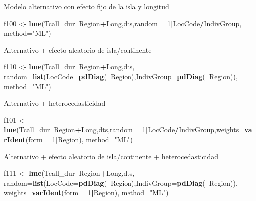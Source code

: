 \documentclass[]{article}
\newenvironment{Shaded}{\begin{snugshade}}{\end{snugshade}}
\newcommand{\DataTypeTok}[1]{\textcolor[rgb]{0.13,0.29,0.53}{#1}}
\newcommand{\DecValTok}[1]{\textcolor[rgb]{0.00,0.00,0.81}{#1}}
\newcommand{\KeywordTok}[1]{\textcolor[rgb]{0.13,0.29,0.53}{\textbf{#1}}}
\newcommand{\NormalTok}[1]{#1}
\newcommand{\OperatorTok}[1]{\textcolor[rgb]{0.81,0.36,0.00}{\textbf{#1}}}
\newcommand{\StringTok}[1]{\textcolor[rgb]{0.31,0.60,0.02}{#1}}
\begin{document}
Modelo alternativo con efecto fijo de la isla y longitud

\begin{Shaded}
\begin{Highlighting}[]
\NormalTok{f100 <-}\StringTok{ }\KeywordTok{lme}\NormalTok{(Tcall_dur}\OperatorTok{~}\NormalTok{Region}\OperatorTok{+}\NormalTok{Long,dts,}\DataTypeTok{random=}\OperatorTok{~}\DecValTok{1}\OperatorTok{|}\NormalTok{LocCode}\OperatorTok{/}\NormalTok{IndivGroup, }\DataTypeTok{method=}\StringTok{"ML"}\NormalTok{)}
\end{Highlighting}
\end{Shaded}

Alternativo + efecto aleatorio de isla/continente

\begin{Shaded}
\begin{Highlighting}[]
\NormalTok{f110 <-}\StringTok{ }\KeywordTok{lme}\NormalTok{(Tcall_dur}\OperatorTok{~}\NormalTok{Region}\OperatorTok{+}\NormalTok{Long,dts,}
     \DataTypeTok{random=}\KeywordTok{list}\NormalTok{(}\DataTypeTok{LocCode=}\KeywordTok{pdDiag}\NormalTok{(}\OperatorTok{~}\NormalTok{Region),}\DataTypeTok{IndivGroup=}\KeywordTok{pdDiag}\NormalTok{(}\OperatorTok{~}\NormalTok{Region)), }\DataTypeTok{method=}\StringTok{"ML"}\NormalTok{)}
\end{Highlighting}
\end{Shaded}

Alternativo + heterocedasticidad

\begin{Shaded}
\begin{Highlighting}[]
\NormalTok{f101 <-}\StringTok{ }\KeywordTok{lme}\NormalTok{(Tcall_dur}\OperatorTok{~}\NormalTok{Region}\OperatorTok{+}\NormalTok{Long,dts,}\DataTypeTok{random=}\OperatorTok{~}\DecValTok{1}\OperatorTok{|}\NormalTok{LocCode}\OperatorTok{/}\NormalTok{IndivGroup,}\DataTypeTok{weights=}\KeywordTok{varIdent}\NormalTok{(}\DataTypeTok{form=}\OperatorTok{~}\DecValTok{1}\OperatorTok{|}\NormalTok{Region), }\DataTypeTok{method=}\StringTok{"ML"}\NormalTok{)}
\end{Highlighting}
\end{Shaded}

Alternativo + efecto aleatorio de isla/continente + heterocedasticidad

\begin{Shaded}
\begin{Highlighting}[]
\NormalTok{f111 <-}
\StringTok{      }\KeywordTok{lme}\NormalTok{(Tcall_dur}\OperatorTok{~}\NormalTok{Region}\OperatorTok{+}\NormalTok{Long,dts,}
        \DataTypeTok{random=}\KeywordTok{list}\NormalTok{(}\DataTypeTok{LocCode=}\KeywordTok{pdDiag}\NormalTok{(}\OperatorTok{~}\NormalTok{Region),}\DataTypeTok{IndivGroup=}\KeywordTok{pdDiag}\NormalTok{(}\OperatorTok{~}\NormalTok{Region)),}
        \DataTypeTok{weights=}\KeywordTok{varIdent}\NormalTok{(}\DataTypeTok{form=}\OperatorTok{~}\DecValTok{1}\OperatorTok{|}\NormalTok{Region), }\DataTypeTok{method=}\StringTok{"ML"}\NormalTok{)}
\end{Highlighting}
\end{Shaded}
\end{document}
